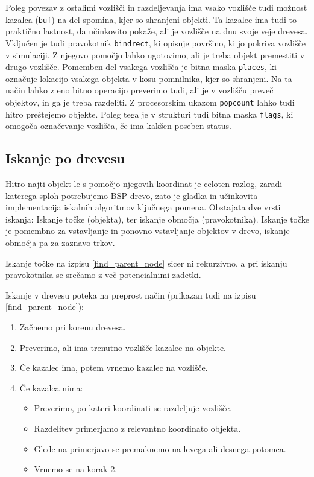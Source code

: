 \documentclass[a4paper,12pt]{article}
\begin{document}
Poleg povezav z ostalimi vozlišči in razdeljevanja ima vsako vozlišče tudi možnost kazalca (\lstinline|buf|) na
del spomina, kjer so shranjeni objekti. Ta kazalec ima tudi to praktično lastnost, da učinkovito
pokaže, ali je vozlišče na dnu svoje veje drevesa. Vključen je tudi pravokotnik \lstinline|bindrect|, ki opisuje površino,
ki jo pokriva vozlišče v simulaciji. Z njegovo pomočjo lahko ugotovimo, ali je treba objekt premestiti v drugo vozlišče.
Pomemben del vsakega vozlišča je bitna maska \lstinline|places|, ki označuje lokacijo vsakega objekta v kosu
pomnilnika, kjer so shranjeni. Na ta način lahko z eno bitno operacijo preverimo tudi, ali je v vozlišču
preveč objektov, in ga je treba razdeliti. Z procesorskim ukazom \lstinline|popcount| lahko tudi hitro
preštejemo objekte.
Poleg tega je v strukturi tudi bitna maska \lstinline|flags|, ki omogoča označevanje vozlišča, če ima
kakšen poseben status.

\subsection{Iskanje po drevesu}

Hitro najti objekt le s pomočjo njegovih koordinat je celoten razlog, zaradi katerega
sploh potrebujemo BSP drevo, zato je gladka in učinkovita implementacija iskalnih algoritmov
ključnega pomena. Obstajata dve vrsti iskanja:
Iskanje točke (objekta), ter iskanje območja (pravokotnika). Iskanje točke je pomembno za
vstavljanje in ponovno vstavljanje objektov v drevo, iskanje območja pa za zaznavo trkov.


Iskanje točke na izpisu \ref{find_parent_node} sicer ni rekurzivno, a pri
iskanju pravokotnika se srečamo z več potencialnimi zadetki.
\begin{samepage}
Iskanje v drevesu poteka na preprost način (prikazan tudi na izpisu \ref{find_parent_node}):
    \begin{enumerate}
        \item Začnemo pri korenu drevesa.
        \item Preverimo, ali ima trenutno vozlišče kazalec na objekte.
        \item Če kazalec ima, potem vrnemo kazalec na vozlišče.
        \item Če kazalca nima:
        \begin{itemize}
            \item Preverimo, po kateri koordinati se razdeljuje vozlišče.
            \item Razdelitev primerjamo z relevantno koordinato objekta.
            \item Glede na primerjavo se premaknemo na levega ali desnega potomca.
            \item Vrnemo se na korak 2.
        \end{itemize}    
    \end{enumerate}
\end{samepage}
\end{document}

